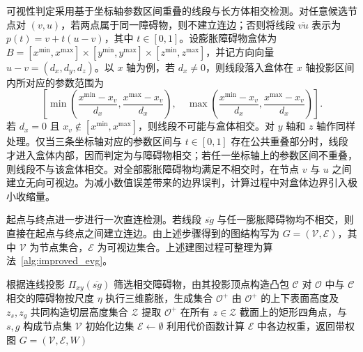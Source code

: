 可视性判定采用基于坐标轴参数区间重叠的线段与长方体相交检测。对任意候选节点对 \((v,u)\)，若两点属于同一障碍物，则不建立连边；否则将线段 \(\overline{vu}\) 表示为 \(p(t)=v+t(u-v)\)，其中 \(t\in[0,1]\)。设膨胀障碍物盒体为 \(B=[x^{\min},x^{\max}]\times[y^{\min},y^{\max}]\times[z^{\min},z^{\max}]\)，并记方向向量 \(u-v=(d_x,d_y,d_z)\)。以 \(x\) 轴为例，若 \(d_x\neq 0\)，则线段落入盒体在 \(x\) 轴投影区间内所对应的参数范围为
\[
\left[\min\left(\frac{x^{\min}-x_v}{d_x},\frac{x^{\max}-x_v}{d_x}\right),\quad
\max\left(\frac{x^{\min}-x_v}{d_x},\frac{x^{\max}-x_v}{d_x}\right)\right].
\]
若 \(d_x=0\) 且 \(x_v\notin[x^{\min},x^{\max}]\)，则线段不可能与盒体相交。对 \(y\) 轴和 \(z\) 轴作同样处理。仅当三条坐标轴对应的参数区间与 \(t\in[0,1]\) 存在公共重叠部分时，线段才进入盒体内部，因而判定为与障碍物相交；若任一坐标轴上的参数区间不重叠，则线段不与该盒体相交。对全部膨胀障碍物均满足不相交时，在节点 \(v\) 与 \(u\) 之间建立无向可视边。为减小数值误差带来的边界误判，计算过程中对盒体边界引入极小收缩量。

起点与终点进一步进行一次直连检测。若线段 \(\overline{sg}\) 与任一膨胀障碍物均不相交，则直接在起点与终点之间建立连边。由上述步骤得到的图结构写为 \(G=(\mathcal V,\mathcal E)\)，其中 \(\mathcal V\) 为节点集合，\(\mathcal E\) 为可视边集合。上述建图过程可整理为算法~\ref{alg:improved_evg}。

\begin{algorithm}[H]
\caption{基于可视图的建图流程}
\label{alg:improved_evg}
\DontPrintSemicolon
\SetAlgoLined
\LinesNumbered
{}
\BlankLine
根据连线投影 \(\Pi_{xy}(\overline{sg})\) 筛选相交障碍物，由其投影顶点构造凸包 \(\mathcal C\)\;
对 \(\mathcal O\) 中与 \(\mathcal C\) 相交的障碍物按尺度 \(\eta\) 执行三维膨胀，生成集合 \(\mathcal O^{+}\)\;
由 \(\mathcal O^{+}\) 的上下表面高度及 \(z_s, z_g\) 共同构造切层高度集合 \(\mathcal Z\)\;
提取 \(\mathcal O^{+}\) 在所有 \(z \in \mathcal Z\) 截面上的矩形四角点，与 \(s, g\) 构成节点集 \(\mathcal V\)\;
初始化边集 \(\mathcal E \leftarrow \emptyset\)\;
利用代价函数计算 \(\mathcal E\) 中各边权重，返回带权图 \(G=(\mathcal V, \mathcal E, W)\)\;
\end{algorithm}

